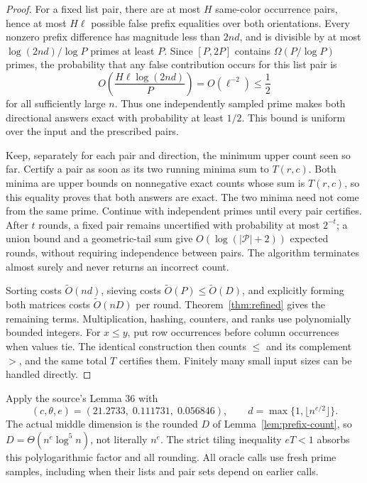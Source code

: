 \documentclass[11pt]{article}
\newcommand{\softO}{\widetilde O}
\begin{document}
\begin{proof}
For a fixed list pair, there are at most $H$ same-color occurrence
pairs, hence at most $H\ell$ possible false prefix equalities over
both orientations. Every nonzero prefix difference has magnitude less
than $2nd$, and is divisible by at most $\log(2nd)/\log P$ primes at
least $P$. Since $[P,2P]$ contains $\Omega(P/\log P)$ primes, the
probability that any false contribution occurs for this list pair is
\[
O\left(\frac{H\ell\log(2nd)}P\right)=O(\ell^{-2})\le\frac12
\]
for all sufficiently large $n$. Thus one independently sampled prime
makes both directional answers exact with probability at least $1/2$.
This bound is uniform over the input and the prescribed pairs.

Keep, separately for each pair and direction, the minimum upper count
seen so far. Certify a pair as soon as its two running minima sum to
$T(r,c)$. Both minima are upper bounds on nonnegative exact counts
whose sum is $T(r,c)$, so this equality proves that both answers are
exact. The two minima need not come from the same prime. Continue with
independent primes until every pair certifies. After $t$ rounds, a
fixed pair remains uncertified with probability at most $2^{-t}$; a
union bound and a geometric-tail sum give $O(\log(|\mathcal P|+2))$
expected rounds, without requiring independence between pairs. The
algorithm terminates almost surely and never returns an incorrect count.

Sorting costs $\softO(nd)$, sieving costs $\softO(P)\le\softO(D)$,
and explicitly forming both matrices costs $\softO(nD)$ per round.
Theorem~\ref{thm:refined} gives the remaining terms. Multiplication,
hashing, counters, and ranks use polynomially bounded integers. For
$x\le y$, put row occurrences before column occurrences when values
tie. The identical construction then counts $\le$ and its complement
$>$, and the same total $T$ certifies them. Finitely many small input
sizes can be handled directly.
\end{proof}

Apply the source's Lemma 36 with
\[
(c,\theta,e)=(21.2733,\;0.111731,\;0.056846),\qquad
d=\max\{1,\lfloor n^{e/2}\rfloor\}.
\]
The actual middle dimension is the rounded $D$ of
Lemma~\ref{lem:prefix-count}, so $D=\Theta(n^e\log^5n)$, not literally
$n^e$. The strict tiling inequality $eT<1$ absorbs this polylogarithmic
factor and all rounding. All oracle calls use fresh prime samples,
including when their lists and pair sets depend on earlier calls.
\end{document}
